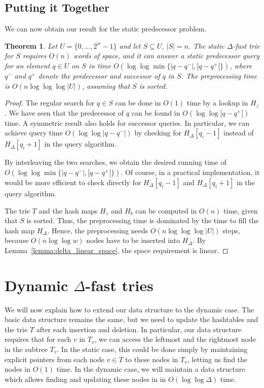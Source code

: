 \documentclass[a4paper,11pt]{article}
\newtheorem{theorem}{Theorem}[section]
\newcommand{\?}{\mskip1.5mu}
\begin{document}
\subsection{Putting it Together}

We can now obtain our result for the static predecessor problem.

\begin{theorem}\label{thm:staticresult}
Let $U = \{0, \dots, 2^{w}-1\}$ and let
$S \subseteq U$, $|S| = n$.
The static $\Delta$-fast trie for $S$ requires
$O(n)$ words of space, and it can answer
a static predecessor query for an element $q \in U$ on $S$ in time
$O(\log \log \min\{|q-q^-|, |q-q^+|\})$,
where $q^-$ and $q^+$ denote the predecessor
and successor of $q$ in $S$.
The preprocessing time is 
$O(n \log\log \log |U|)$, assuming that
$S$ is sorted.
\end{theorem}

\begin{proof}
The regular search for $q \in S$ can be done in 
$O(1)$ time by a lookup in $H_z$. 
We have seen that the predecessor of $q$
can be found in $O(\log \log |q-q^+|)$ time.
A symmetric result also holds for 
successor queries.
In particular, we can achieve query time 
$O(\log \log |q-q^-|)$  by checking for
$H_\Delta[q_i-1]$ instead of $H_\Delta[q_i+1]$ in the 
query algorithm. 

By interleaving the two searches,
we obtain the desired running time of 
$O(\log\log \min\{|q - q^-|, |q - q^+|\})$. 
Of course, in a practical implementation, it would be 
more efficient to check directly for $H_\Delta[q_i-1]$
and $H_\Delta[q_i+1]$ in the query algorithm.

The trie $T$ and the hash maps $H_z$
and $H_b$ can be computed in $O(n)$ time, given that
$S$ is sorted.
Thus, the preprocessing time is dominated by the time to fill the 
hash map $H_\Delta$.  Hence, the preprocessing needs
$O(n\log\log\log |U|)$ steps, because $O(n\log\log w)$ nodes 
have to be
inserted into $H_\Delta$. 
By Lemma~\ref{lemma:delta_linear_space}, the space requirement
is linear.
\end{proof}

\section{Dynamic $\Delta$-fast tries}

We will now explain how to extend our data
structure to the dynamic case. 
The basic data structure remains the same, but
we need to update the hashtables and the trie $T$
after each insertion and deletion.
In particular, our data structure requires that
for each $v$ in $T_v$, we can access the 
leftmost and the rightmost node
in the subtree $T_v$.
In the static case, this could be done simply
by maintaining explicit pointers from each node
$v \in T$ to these nodes in $T_v$, letting us find
the nodes in $O(1)$ time.
In the dynamic case, we will maintain a data structure
which allows finding and updating these nodes in
in $O(\log\log \Delta)$ time.
\end{document}
